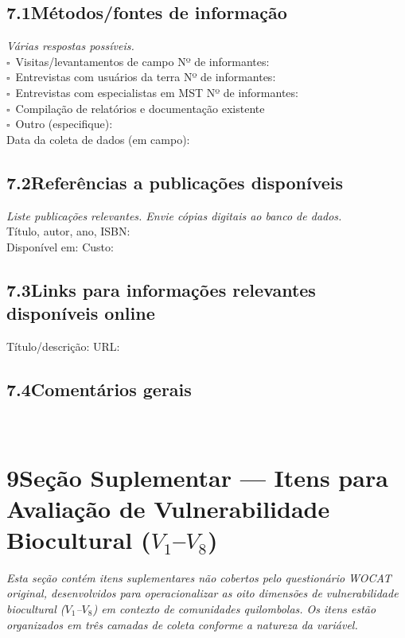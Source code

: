 \subsection{7.1\quad Métodos/fontes de informação}
\textit{Várias respostas possíveis.}\\[4pt]
$\square$~Visitas/levantamentos de campo \quad Nº de informantes: \dotfill\\
$\square$~Entrevistas com usuários da terra \quad Nº de informantes: \dotfill\\
$\square$~Entrevistas com especialistas em MST \quad Nº de informantes: \dotfill\\
$\square$~Compilação de relatórios e documentação existente\\
$\square$~Outro (especifique): \dotfill\\[4pt]
Data da coleta de dados (em campo): \dotfill

\subsection{7.2\quad Referências a publicações disponíveis}
\textit{Liste publicações relevantes. Envie cópias digitais ao banco de dados.}\\[4pt]
Título, autor, ano, ISBN: \dotfill\\
Disponível em: \dotfill\quad Custo: \dotfill

\subsection{7.3\quad Links para informações relevantes disponíveis online}
Título/descrição: \dotfill\quad URL: \dotfill

\subsection{7.4\quad Comentários gerais}
\dotfill\\[2pt]\dotfill

\section{9\quad Seção Suplementar --- Itens para Avaliação de Vulnerabilidade Biocultural ($V_1$--$V_8$)}
\label{sec:suplementar}

\noindent\textit{Esta seção contém itens suplementares não cobertos pelo questionário WOCAT original, desenvolvidos para operacionalizar as oito dimensões de vulnerabilidade biocultural ($V_1$--$V_8$) em contexto de comunidades quilombolas. Os itens estão organizados em três camadas de coleta conforme a natureza da variável.}

